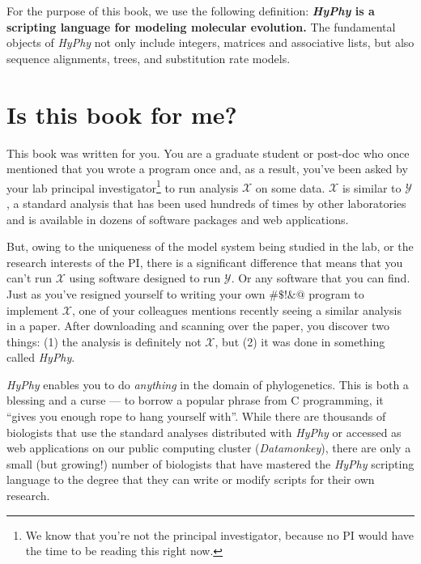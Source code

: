 \documentclass[12pt]{book}
\newcommand{\hyphy}{\textit{HyPhy }}
\begin{document}
For the purpose of this book, we use the following definition: {\bf \hyphy is a scripting language for modeling molecular evolution.}  The fundamental objects of \hyphy not only include integers, matrices and associative lists, but also sequence alignments, trees, and substitution rate models.

\section {Is this book for me?}

This book was written for you.  You are a graduate student or post-doc who once mentioned that you wrote a program once and, as a result, you've been asked by your lab principal investigator\footnote{We know that you're not the principal investigator, because no PI would have the time to be reading this right now.} to run analysis $\mathcal{X}$ on some data.  $\mathcal{X}$ is similar to $\mathcal{Y}$, a standard analysis that has been used hundreds of times by other laboratories and is available in dozens of software packages and web applications.  

But, owing to the uniqueness of the model system being studied in the lab, or the research interests of the PI, there is a significant difference that means that you can't run $\mathcal{X}$ using software designed to run $\mathcal{Y}$.  Or any software that you can find.  Just as you've resigned yourself to writing your own $\#\$!\&@$ program to implement $\mathcal{X}$, one of your colleagues mentions recently seeing a similar analysis in a paper.  After downloading and scanning over the paper, you discover two things: (1) the analysis is definitely not $\mathcal{X}$, but (2) it was done in something called {\it HyPhy}.  

\hyphy enables you to do {\it anything} in the domain of phylogenetics.  This is both a blessing and a curse --- to borrow a popular phrase from C programming, it ``gives you enough rope to hang yourself with''.  While there are thousands of biologists that use the standard analyses distributed with \hyphy or accessed as web applications on our public computing cluster ({\it Datamonkey}), there are only a small (but growing!) number of biologists that have mastered the \hyphy scripting language to the degree that they can write or modify scripts for their own research.  
\end{document}
